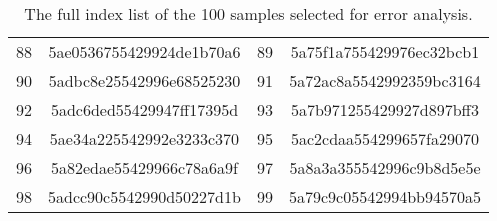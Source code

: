 \documentclass[11pt,a4paper]{article}
\begin{document}
\begin{table*}[t!]
\begin{tabular}{lclc}
88 & 5ae0536755429924de1b70a6 & 89 & 5a75f1a755429976ec32bcb1 \\
90 & 5adbc8e25542996e68525230 & 91 & 5a72ac8a5542992359bc3164 \\
92 & 5adc6ded55429947ff17395d & 93 & 5a7b971255429927d897bff3 \\
94 & 5ae34a225542992e3233c370 & 95 & 5ac2cdaa554299657fa29070 \\
96 & 5a82edae55429966c78a6a9f & 97 & 5a8a3a355542996c9b8d5e5e \\
98 & 5adcc90c5542990d50227d1b & 99 & 5a79c9c05542994bb94570a5 \\
\hline
    \end{tabular}
    \caption{The full index list of the 100 samples selected for error analysis.}
    \label{tab:sample_index}
\end{table*}
 
\end{document}
